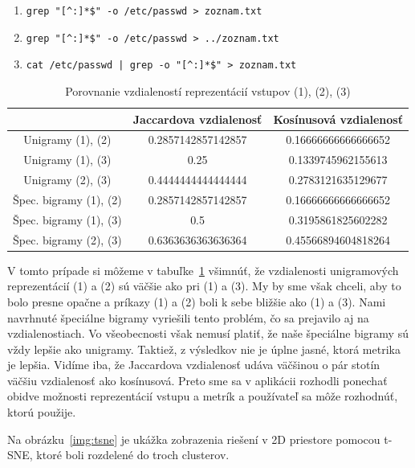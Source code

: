 \begin{enumerate}[label={(\arabic*)}]
	\item \verb'grep "[^:]*$" -o /etc/passwd > zoznam.txt'
	\item \verb'grep "[^:]*$" -o /etc/passwd > ../zoznam.txt'
	\item \verb'cat /etc/passwd | grep -o "[^:]*$" > zoznam.txt'
\end{enumerate}

\begin{table}[h]
	\centering
	\begin{tabular}{|c||c|c|} 
		\hline
		& Jaccardova vzdialenosť
		& Kosínusová vzdialenosť\\
		\hline
		Unigramy (1), (2) & 0.2857142857142857 & 0.16666666666666652\\
		\hline
		Unigramy (1), (3) & 0.25 & 0.1339745962155613\\
		\hline
		Unigramy (2), (3) & 0.4444444444444444 & 0.2783121635129677\\
		\Xhline{1.5pt}
		Špec. bigramy (1), (2) & 0.2857142857142857 & 0.16666666666666652\\
		\hline
		Špec. bigramy (1), (3) & 0.5 & 0.3195861825602282\\
		\hline
		Špec. bigramy (2), (3) & 0.6363636363636364 & 0.45566894604818264\\
		\hline
	\end{tabular}
	\caption[Porovnanie vzdialeností reprezentácií vstupov (1), (2), (3)]{Porovnanie vzdialeností reprezentácií vstupov (1), (2), (3)}
	\label{tab:distances2}
\end{table}

V tomto prípade si môžeme v tabuľke~\ref{tab:distances2}
všimnúť, že vzdialenosti unigramových reprezentácií
(1) a (2) sú väčšie ako pri (1) a (3). My by sme však chceli, aby to bolo presne opačne
a príkazy (1) a (2) boli k sebe bližšie ako (1) a (3). Nami navrhnuté špeciálne bigramy
vyriešili tento problém, čo sa prejavilo aj na vzdialenostiach.
Vo všeobecnosti však nemusí platiť, že naše špeciálne bigramy sú vždy lepšie ako unigramy. Taktiež, z výsledkov nie je úplne jasné, ktorá metrika
je lepšia. Vidíme iba, že Jaccardova vzdialenosť udáva väčšinou o pár stotín
väčšiu vzdialenosť ako kosínusová.
Preto sme sa v aplikácii rozhodli ponechať obidve možnosti reprezentácií vstupu a
metrík a používateľ sa môže rozhodnúť, ktorú použije. 

Na obrázku~\ref{img:tsne} je ukážka zobrazenia riešení v 2D priestore pomocou
t-SNE, ktoré boli rozdelené do troch clusterov.

